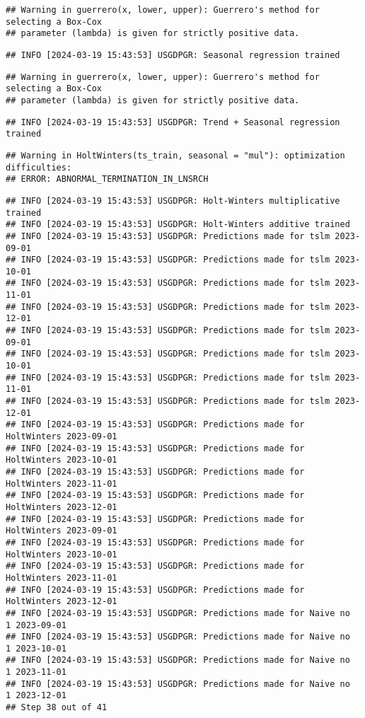 \documentclass[
]{article}
\begin{document}
\begin{verbatim}
## Warning in guerrero(x, lower, upper): Guerrero's method for selecting a Box-Cox
## parameter (lambda) is given for strictly positive data.
\end{verbatim}

\begin{verbatim}
## INFO [2024-03-19 15:43:53] USGDPGR: Seasonal regression trained
\end{verbatim}

\begin{verbatim}
## Warning in guerrero(x, lower, upper): Guerrero's method for selecting a Box-Cox
## parameter (lambda) is given for strictly positive data.
\end{verbatim}

\begin{verbatim}
## INFO [2024-03-19 15:43:53] USGDPGR: Trend + Seasonal regression trained
\end{verbatim}

\begin{verbatim}
## Warning in HoltWinters(ts_train, seasonal = "mul"): optimization difficulties:
## ERROR: ABNORMAL_TERMINATION_IN_LNSRCH
\end{verbatim}

\begin{verbatim}
## INFO [2024-03-19 15:43:53] USGDPGR: Holt-Winters multiplicative trained
## INFO [2024-03-19 15:43:53] USGDPGR: Holt-Winters additive trained
## INFO [2024-03-19 15:43:53] USGDPGR: Predictions made for tslm 2023-09-01
## INFO [2024-03-19 15:43:53] USGDPGR: Predictions made for tslm 2023-10-01
## INFO [2024-03-19 15:43:53] USGDPGR: Predictions made for tslm 2023-11-01
## INFO [2024-03-19 15:43:53] USGDPGR: Predictions made for tslm 2023-12-01
## INFO [2024-03-19 15:43:53] USGDPGR: Predictions made for tslm 2023-09-01
## INFO [2024-03-19 15:43:53] USGDPGR: Predictions made for tslm 2023-10-01
## INFO [2024-03-19 15:43:53] USGDPGR: Predictions made for tslm 2023-11-01
## INFO [2024-03-19 15:43:53] USGDPGR: Predictions made for tslm 2023-12-01
## INFO [2024-03-19 15:43:53] USGDPGR: Predictions made for HoltWinters 2023-09-01
## INFO [2024-03-19 15:43:53] USGDPGR: Predictions made for HoltWinters 2023-10-01
## INFO [2024-03-19 15:43:53] USGDPGR: Predictions made for HoltWinters 2023-11-01
## INFO [2024-03-19 15:43:53] USGDPGR: Predictions made for HoltWinters 2023-12-01
## INFO [2024-03-19 15:43:53] USGDPGR: Predictions made for HoltWinters 2023-09-01
## INFO [2024-03-19 15:43:53] USGDPGR: Predictions made for HoltWinters 2023-10-01
## INFO [2024-03-19 15:43:53] USGDPGR: Predictions made for HoltWinters 2023-11-01
## INFO [2024-03-19 15:43:53] USGDPGR: Predictions made for HoltWinters 2023-12-01
## INFO [2024-03-19 15:43:53] USGDPGR: Predictions made for Naive no  1 2023-09-01
## INFO [2024-03-19 15:43:53] USGDPGR: Predictions made for Naive no  1 2023-10-01
## INFO [2024-03-19 15:43:53] USGDPGR: Predictions made for Naive no  1 2023-11-01
## INFO [2024-03-19 15:43:53] USGDPGR: Predictions made for Naive no  1 2023-12-01
## Step 38 out of 41
\end{verbatim}
\end{document}
